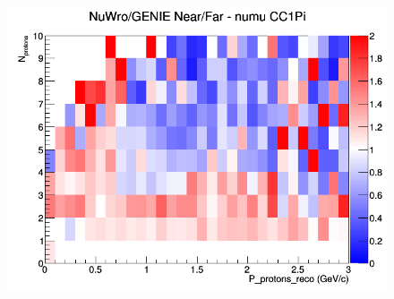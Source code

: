 \documentclass[12pt]{article}
\begin{document}
\begin{figure}[h]
\endminipage
{}
\includegraphics[width=\linewidth]{eff_N_P/FGT/protons/ratios/CC1Pi_NuWro_GENIE_numu_NF_N_P.png}
\endminipage
\newline
\end{figure}
\clearpage
\end{document}
